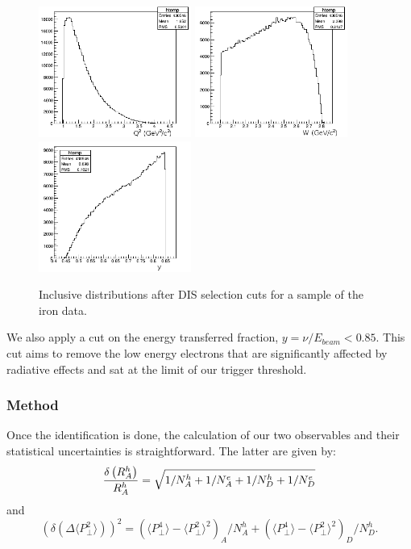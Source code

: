 \begin{figure}[tbp]
\centering
\includegraphics[width=5cm] {answer-fig/DIS-Q2.png} 
\includegraphics[width=5cm] {answer-fig/DIS-w.png} 
\includegraphics[width=5cm] {answer-fig/DIS-y.png} 
\caption {Inclusive distributions after DIS selection cuts for a sample of the iron
data.}
\label{DISKine}
\end{figure}

We also apply a cut on the energy transferred fraction, $y = \nu/E_{beam} < 0.85$. This cut aims to remove the low energy electrons that are significantly affected by radiative effects and sat at the limit of our trigger threshold.

\subsubsection{Method}
\label{RatioCalc}

Once the identification is done, the calculation of our two observables and their statistical uncertainties is straightforward. The latter are given by:
\begin{equation}
\label{eq:MRError}
{\delta \left ( R_A^h \right ) \over R_A^h} = \sqrt{ 1 /N_A^h + 1/ N_A^e +1/N_D^h + 1/N_D^e}
\end{equation}
and
\begin{equation}
\label{eq:DPtError}
\left ( \delta \left ( \Delta \langle P_\perp^2 \rangle \right ) \right )^2 = 
   \left ({\langle P_\perp^4 \rangle - \langle P_\perp^2 \rangle ^2}\right )_A / N_A^h
 + \left ({\langle P_\perp^4 \rangle - \langle P_\perp^2 \rangle ^2}\right )_D / N_D^h.
\end{equation}


